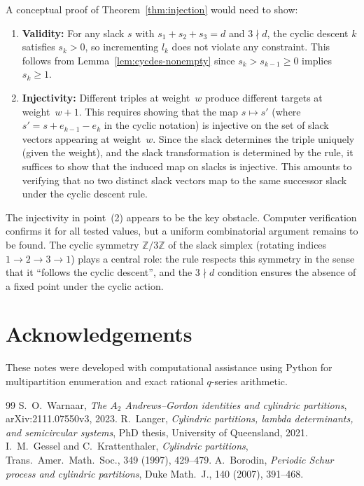 \documentclass[11pt]{article}
\newcommand{\Z}{\mathbb{Z}}
\begin{document}
A conceptual proof of Theorem~\ref{thm:injection} would need to show:
\begin{enumerate}
  \item \textbf{Validity:} For any slack $s$ with $s_1 + s_2 + s_3 = d$ and
    $3 \nmid d$, the cyclic descent $k$ satisfies $s_k > 0$, so incrementing
    $l_k$ does not violate any constraint. This follows from
    Lemma~\ref{lem:cycdes-nonempty} since $s_k > s_{k-1} \geq 0$
    implies $s_k \geq 1$.

  \item \textbf{Injectivity:} Different triples at weight~$w$ produce
    different targets at weight~$w+1$. This requires showing that the map
    $s \mapsto s'$ (where $s' = s + e_{k-1} - e_k$ in the cyclic notation)
    is injective on the set of slack vectors appearing at weight~$w$.
    Since the slack determines the triple uniquely (given the weight), and
    the slack transformation is determined by the rule, it suffices to show
    that the induced map on slacks is injective. This amounts to verifying
    that no two distinct slack vectors map to the same successor slack under
    the cyclic descent rule.
\end{enumerate}

The injectivity in point~(2) appears to be the key obstacle. Computer verification
confirms it for all tested values, but a uniform combinatorial argument remains to
be found. The cyclic symmetry $\Z/3\Z$ of the slack simplex
(rotating indices $1 \to 2 \to 3 \to 1$) plays a central role: the rule respects
this symmetry in the sense that it ``follows the cyclic descent'', and the
$3 \nmid d$ condition ensures the absence of a fixed point under the cyclic action.


\section*{Acknowledgements}

These notes were developed with computational assistance using Python for
multipartition enumeration and exact rational $q$-series arithmetic.

\begin{thebibliography}{99}
 S.~O.~Warnaar, \emph{The $A_2$ Andrews--Gordon identities
  and cylindric partitions}, arXiv:2111.07550v3, 2023.
 R.~Langer, \emph{Cylindric partitions, lambda determinants,
  and semicircular systems}, PhD thesis, University of Queensland, 2021.
 I.~M.~Gessel and C.~Krattenthaler, \emph{Cylindric partitions},
  Trans.\ Amer.\ Math.\ Soc., 349 (1997), 429--479.
 A.~Borodin, \emph{Periodic Schur process and cylindric
  partitions}, Duke Math.\ J., 140 (2007), 391--468.
\end{thebibliography}
\end{document}
